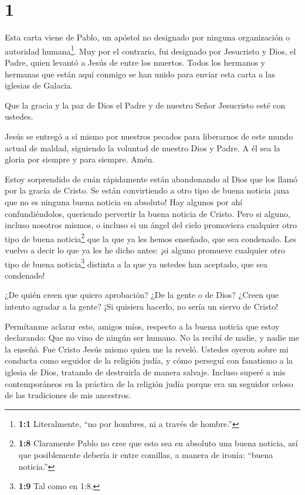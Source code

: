 \hypertarget{section}{%
\section{1}\label{section}}

 Esta carta viene de Pablo, un apóstol no designado por
ninguna organización o autoridad humana\footnote{\textbf{1:1}
  Literalmente, ``no por hombres, ni a través de hombre.''}. Muy por el
contrario, fui designado por Jesucristo y Dios, el Padre, quien levantó
a Jesús de entre los muertos.  Todos los hermanos y hermanas
que están aquí conmigo se han unido para enviar esta carta a las
iglesias de Galacia.

 Que la gracia y la paz de Dios el Padre y de nuestro Señor
Jesucristo esté con ustedes.

 Jesús se entregó a sí mismo por nuestros pecados para
liberarnos de este mundo actual de maldad, siguiendo la voluntad de
nuestro Dios y Padre.  A él sea la gloria por siempre y para
siempre. Amén.

 Estoy sorprendido de cuán rápidamente están abandonando al
Dios que los llamó por la gracia de Cristo. Se están convirtiendo a otro
tipo de buena noticia  ¡una que no es ninguna buena noticia
en absoluto! Hay algunos por ahí confundiéndolos, queriendo pervertir la
buena noticia de Cristo.  Pero si alguno, incluso nosotros
mismos, o incluso si un ángel del cielo promoviera cualquier otro tipo
de buena noticia\footnote{\textbf{1:8} Claramente Pablo no cree que esto
  sea en absoluto una buena noticia, así que posiblemente debería ir
  entre comillas, a manera de ironía: ``buena noticia.''} que la que ya
les hemos enseñado, que sea condenado.  Les vuelvo a decir
lo que ya les he dicho antes: ¡si alguno promueve cualquier otro tipo de
buena noticia\footnote{\textbf{1:9} Tal como en 1:8.} distinta a la que
ya ustedes han aceptado, que sea condenado!

 ¿De quién creen que quiero aprobación? ¿De la gente o de
Dios? ¿Creen que intento agradar a la gente? ¡Si quisiera hacerlo, no
sería un siervo de Cristo!

 Permítanme aclarar esto, amigos míos, respecto a la buena
noticia que estoy declarando: Que no vino de ningún ser humano.
 No la recibí de nadie, y nadie me la enseñó. Fue Cristo
Jesús mismo quien me la reveló.  Ustedes oyeron sobre mi
conducta como seguidor de la religión judía, y cómo perseguí con
fanatismo a la iglesia de Dios, tratando de destruirla de manera
salvaje.  Incluso superé a mis contemporáneos en la
práctica de la religión judía porque era un seguidor celoso de las
tradiciones de mis ancestros.

